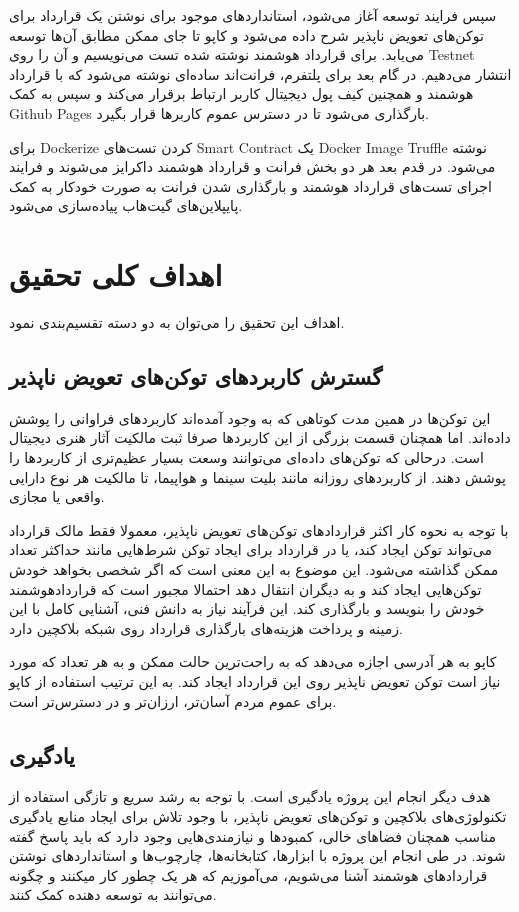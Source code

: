 سپس فرایند توسعه آغاز می‌شود، استاندارد‌های موجود برای نوشتن یک قرارداد برای توکن‌های تعویض ناپذیر شرح داده می‌شود و کاپو تا جای ممکن مطابق آن‌ها توسعه می‌یابد. برای قرارداد هوشمند نوشته شده تست می‌نویسیم و آن را روی
\gls{Testnet}
انتشار می‌دهیم.
در گام بعد برای پلتفرم، فرانت‌اند ساده‌ای نوشته می‌شود که با قرارداد هوشمند و همچنین کیف پول دیجیتال کاربر ارتباط برقرار می‌کند و سپس به کمک
\gls{Github Pages}
بارگذاری می‌شود تا در دسترس عموم کاربرها قرار بگیرد.

برای
\gls{Dockerize}
کردن تست‌های
\gls{Smart Contract}
یک
\gls{Docker Image}
\gls{Truffle}
نوشته می‌شود. در قدم بعد هر دو بخش فرانت و قرارداد هوشمند داکرایز می‌شوند و فرایند اجرای تست‌های قرارداد هوشمند و بارگذاری شدن فرانت به صورت خودکار به کمک پایپلاین‌های گیت‌هاب پیاده‌سازی می‌شود.


\section{اهداف کلی تحقیق}
اهداف این تحقیق را می‌توان به دو دسته تقسیم‌بندی نمود.

\subsection{گسترش کاربرد‌های توکن‌های تعویض ناپذیر}
این توکن‌ها در همین مدت کوتاهی که به وجود آمده‌اند کاربردهای فراوانی را پوشش داده‌اند. اما همچنان قسمت بزرگی از این کاربردها صرفا ثبت مالکیت آثار هنری دیجیتال است. درحالی که توکن‌های داده‌ای می‌توانند وسعت بسیار عظیم‌تری از کاربردها را پوشش دهند. از کاربردهای روزانه مانند بلیت سینما و هواپیما، تا مالکیت هر نوع دارایی واقعی یا مجازی.

با توجه به نحوه کار اکثر قراردادهای توکن‌های تعویض ناپذیر، معمولا فقط مالک قرارداد می‌تواند توکن ایجاد کند، یا در قرارداد برای ایجاد توکن شرط‌هایی مانند حداکثر تعداد ممکن گذاشته می‌شود. این موضوع به این معنی است که اگر شخصی بخواهد خودش توکن‌هایی ایجاد کند و به دیگران انتقال دهد احتمالا مجبور است که قراردادهوشمند خودش را بنویسد و بارگذاری کند. این فرآیند نیاز به دانش فنی، آشنایی کامل با این زمینه و پرداخت هزینه‌های بارگذاری قرارداد روی شبکه بلاکچین دارد.

کاپو به هر آدرسی اجازه می‌دهد که به راحت‌ترین حالت ممکن و به هر تعداد که مورد نیاز است توکن تعویض ناپذیر روی این قرارداد ایجاد کند. به این ترتیب استفاده از کاپو برای عموم مردم آسان‌تر، ارزان‌تر و در دسترس‌تر است.

\subsection{یادگیری}
هدف دیگر انجام این پروژه یادگیری است. با توجه به رشد سریع و تازگی استفاده از تکنولوژی‌های بلاکچین و توکن‌های تعویض ناپذیر، با وجود تلاش برای ایجاد منابع یادگیری مناسب همچنان فضاهای خالی، کمبودها و نیازمندی‌هایی وجود دارد که باید پاسخ گفته شوند. در طی انجام این پروژه با ابزارها، کتابخانه‌ها، چارچوب‌ها و استانداردهای نوشتن قراردادهای هوشمند آشنا می‌شویم، می‌آموزیم که هر یک چطور کار میکنند و چگونه می‌توانند به توسعه دهنده کمک کنند.

